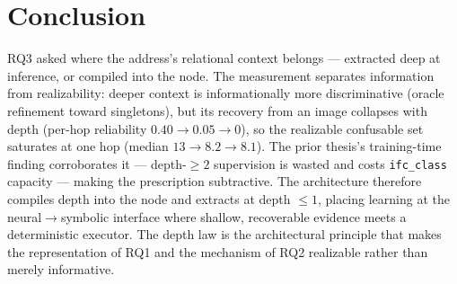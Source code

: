 \section{Conclusion}

RQ3 asked where the address's relational context belongs --- extracted deep at inference, or compiled
into the node. The measurement separates information from realizability: deeper context is
informationally more discriminative (oracle refinement toward singletons), but its recovery from an
image collapses with depth (per-hop reliability $0.40 \to 0.05 \to 0$), so the realizable confusable
set saturates at one hop (median $13 \to 8.2 \to 8.1$). The prior thesis's training-time finding
corroborates it --- depth-$\ge 2$ supervision is wasted and costs \texttt{ifc\_class} capacity ---
making the prescription subtractive. The architecture therefore compiles depth into the node and
extracts at depth $\le 1$, placing learning at the neural$\to$symbolic interface where shallow,
recoverable evidence meets a deterministic executor. The depth law is the architectural principle that
makes the representation of RQ1 and the mechanism of RQ2 realizable rather than merely informative.
